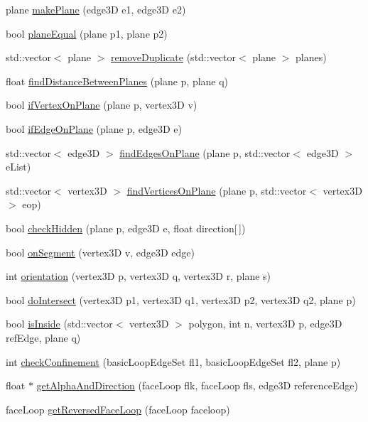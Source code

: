 \begin{DoxyCompactItemize}
\item 
plane \mbox{\hyperlink{namespacegeneral_methods_a06d99f1b292d29dbdbe4734847c8d2ee}{make\+Plane}} (edge3D e1, edge3D e2)
\item 
bool \mbox{\hyperlink{namespacegeneral_methods_a3c49599a5ba8f2c41f2ef542bde19765}{plane\+Equal}} (plane p1, plane p2)
\item 
std\+::vector$<$ plane $>$ \mbox{\hyperlink{namespacegeneral_methods_a9258a7b34f46d6c0b38723a700507535}{remove\+Duplicate}} (std\+::vector$<$ plane $>$ planes)
\item 
float \mbox{\hyperlink{namespacegeneral_methods_a3bc88a001e751ad419e87bf3795ca02b}{find\+Distance\+Between\+Planes}} (plane p, plane q)
\item 
bool \mbox{\hyperlink{namespacegeneral_methods_a330682bb45234d8de5228a7607d493d2}{if\+Vertex\+On\+Plane}} (plane p, vertex3D v)
\item 
bool \mbox{\hyperlink{namespacegeneral_methods_a21d2e8c181e8cac3762d9ca1871d2168}{if\+Edge\+On\+Plane}} (plane p, edge3D e)
\item 
std\+::vector$<$ edge3D $>$ \mbox{\hyperlink{namespacegeneral_methods_abf0a07083176ad5167f5ed4c89b5c5cb}{find\+Edges\+On\+Plane}} (plane p, std\+::vector$<$ edge3D $>$ e\+List)
\item 
std\+::vector$<$ vertex3D $>$ \mbox{\hyperlink{namespacegeneral_methods_acc1b72abf045cf0d466f2829134e7d66}{find\+Vertices\+On\+Plane}} (plane p, std\+::vector$<$ vertex3D $>$ eop)
\item 
bool \mbox{\hyperlink{namespacegeneral_methods_ab4e1b4b0a8b5b7697adddbb27950e639}{check\+Hidden}} (plane p, edge3D e, float direction\mbox{[}$\,$\mbox{]})
\item 
bool \mbox{\hyperlink{namespacegeneral_methods_a557bf2257d6658862b42124035aa9588}{on\+Segment}} (vertex3D v, edge3D edge)
\item 
int \mbox{\hyperlink{namespacegeneral_methods_a7bfbfb2a02328d76e70f66fedd57c4ef}{orientation}} (vertex3D p, vertex3D q, vertex3D r, plane s)
\item 
bool \mbox{\hyperlink{namespacegeneral_methods_a56efd049c58aae30a7b0caf39beab615}{do\+Intersect}} (vertex3D p1, vertex3D q1, vertex3D p2, vertex3D q2, plane p)
\item 
bool \mbox{\hyperlink{namespacegeneral_methods_a27b7ed292415027c495942147e8856b7}{is\+Inside}} (std\+::vector$<$ vertex3D $>$ polygon, int n, vertex3D p, edge3D ref\+Edge, plane q)
\item 
int \mbox{\hyperlink{namespacegeneral_methods_a2bb810600ec90ec064ea8496ee0ab862}{check\+Confinement}} (basic\+Loop\+Edge\+Set fl1, basic\+Loop\+Edge\+Set fl2, plane p)
\item 
float $\ast$ \mbox{\hyperlink{namespacegeneral_methods_acb2c7a35ffed7d34eff248b9d99aaa6b}{get\+Alpha\+And\+Direction}} (face\+Loop flk, face\+Loop fls, edge3D reference\+Edge)
\item 
face\+Loop \mbox{\hyperlink{namespacegeneral_methods_afe4087e253b318326a0a1578d34b42ca}{get\+Reversed\+Face\+Loop}} (face\+Loop faceloop)
\end{DoxyCompactItemize}


